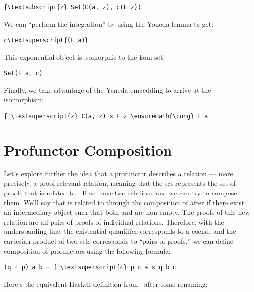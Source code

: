 \begin{Verbatim}[commandchars=\\\{\}]
∫\textsubscript{z} Set(C(a, z), c(F z))
\end{Verbatim}
We can ``perform the integration'' by using the Yoneda lemma to get:

\begin{Verbatim}[commandchars=\\\{\}]
c\textsuperscript{(F a)}
\end{Verbatim}
This exponential object is isomorphic to the hom-set:

\begin{Verbatim}[commandchars=\\\{\}]
Set(F a, c)
\end{Verbatim}
Finally, we take advantage of the Yoneda embedding to arrive at the
isomorphism:

\begin{Verbatim}[commandchars=\\\{\}]
∫ \textsuperscript{z} C(a, z) × F z \ensuremath{\cong} F a
\end{Verbatim}

\section{Profunctor Composition}\label{profunctor-composition}

Let's explore further the idea that a profunctor describes a relation
--- more precisely, a proof-relevant relation, meaning that the set
 represents the set of proofs that  is related
to . If we have two relations  and  we can
try to compose them. We'll say that  is related to 
through the composition of  after  if there exist an
intermediary object  such that both  and
 are non-empty. The proofs of this new relation are all
pairs of proofs of individual relations. Therefore, with the
understanding that the existential quantifier corresponds to a coend,
and the cartesian product of two sets corresponds to ``pairs of
proofs,'' we can define composition of profunctors using the following
formula:

\begin{Verbatim}[commandchars=\\\{\}]
(q ◦ p) a b = ∫ \textsuperscript{c} p c a × q b c
\end{Verbatim}
Here's the equivalent Haskell definition from
, after some renaming:

